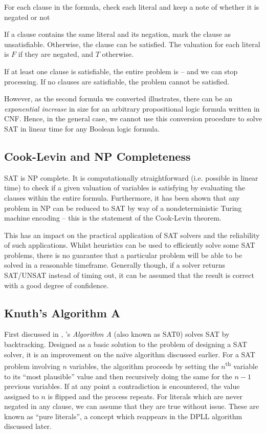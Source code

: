 \documentclass[a4paper,openany,12pt]{book}
\begin{document}
\begin{outline}
    \1 For each clause in the formula, check each literal and keep a note of whether it is negated or not

    \2 If a clause contains the same literal and its negation, mark the clause as unsatisfiable.
    \2 Otherwise, the clause can be satisfied. The valuation for each literal is $F$ if they are negated, and $T$
       otherwise.

    \1 If at least one clause is satisfiable, the entire problem is -- and we can stop processing.
    \1 If no clauses are satisfiable, the problem cannot be satisfied.
\end{outline}

However, as the second formula we converted illustrates, there can be an \emph{exponential increase} in size for an
arbitrary propositional logic formula written in CNF.
Hence, in the general case, we cannot use this conversion procedure to solve SAT in linear time for any Boolean logic
formula.

\subsection{Cook-Levin and NP Completeness}

SAT is NP complete.
It is computationally straightforward (i.e. possible in linear time) to check if a given valuation of variables is
satisfying by evaluating the clauses within the entire formula.
Furthermore, it has been shown that any problem in NP can be reduced to SAT by way of a nondeterministic Turing machine
encoding \citep{Cook:1971:CTP:800157.805047} -- this is the statement of the Cook-Levin theorem.

This has an impact on the practical application of SAT solvers and the reliability of such applications.
Whilst heuristics can be used to efficiently solve some SAT problems, there is no guarantee that a particular problem
will be able to be solved in a reasonable timeframe.
Generally though, if a solver returns SAT/UNSAT instead of timing out, it can be assumed that the result is correct with
a good degree of confidence.

\subsection{Knuth's Algorithm A}

First discussed in \citet{Knuth:2015:ACP:2898950}, \citeauthor{Knuth:2015:ACP:2898950}'s \emph{Algorithm A} (also known
as \textsc{SAT0}) solves SAT by backtracking.
Designed as a basic solution to the problem of designing a SAT solver, it is an improvement on the naïve algorithm
discussed earlier.
For a SAT problem involving $n$ variables, the algorithm proceeds by setting the $n$\textsuperscript{th} variable to its
``most plausible'' value and then recursively doing the same for the $n-1$ previous variables.
If at any point a contradiction is encountered, the value assigned to $n$ is flipped and the process repeats.
For literals which are never negated in any clause, we can assume that they are true without issue.
These are known as ``pure literals'', a concept which reappears in the DPLL algorithm discussed later.
\end{document}
